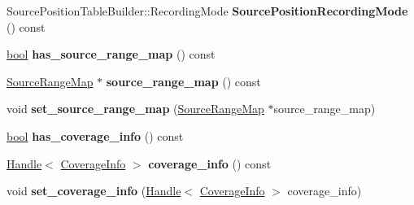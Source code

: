\begin{DoxyCompactItemize}
Source\+Position\+Table\+Builder\+::\+Recording\+Mode {\bfseries Source\+Position\+Recording\+Mode} () const
\item 
\mbox{\label{classv8_1_1internal_1_1UnoptimizedCompilationInfo_a14528d60e3cf38f20cedcdd180f4466e}} 
\mbox{\hyperlink{classbool}{bool}} {\bfseries has\+\_\+source\+\_\+range\+\_\+map} () const
\item 
\mbox{\label{classv8_1_1internal_1_1UnoptimizedCompilationInfo_ad9f3c966c5a079d2430c6d19c68a5131}} 
\mbox{\hyperlink{classv8_1_1internal_1_1SourceRangeMap}{Source\+Range\+Map}} $\ast$ {\bfseries source\+\_\+range\+\_\+map} () const
\item 
\mbox{\label{classv8_1_1internal_1_1UnoptimizedCompilationInfo_a5d05db1124532744b39b43b663d7d792}} 
void {\bfseries set\+\_\+source\+\_\+range\+\_\+map} (\mbox{\hyperlink{classv8_1_1internal_1_1SourceRangeMap}{Source\+Range\+Map}} $\ast$source\+\_\+range\+\_\+map)
\item 
\mbox{\label{classv8_1_1internal_1_1UnoptimizedCompilationInfo_a555a5461debea88eee43b521269cbd8d}} 
\mbox{\hyperlink{classbool}{bool}} {\bfseries has\+\_\+coverage\+\_\+info} () const
\item 
\mbox{\label{classv8_1_1internal_1_1UnoptimizedCompilationInfo_ad54a000243001ab44c3c28df33751582}} 
\mbox{\hyperlink{classv8_1_1internal_1_1Handle}{Handle}}$<$ \mbox{\hyperlink{classv8_1_1internal_1_1CoverageInfo}{Coverage\+Info}} $>$ {\bfseries coverage\+\_\+info} () const
\item 
\mbox{\label{classv8_1_1internal_1_1UnoptimizedCompilationInfo_ab5d14c7a368ade8596f2a7bfff540040}} 
void {\bfseries set\+\_\+coverage\+\_\+info} (\mbox{\hyperlink{classv8_1_1internal_1_1Handle}{Handle}}$<$ \mbox{\hyperlink{classv8_1_1internal_1_1CoverageInfo}{Coverage\+Info}} $>$ coverage\+\_\+info)
\item 
\mbox{\label{classv8_1_1internal_1_1UnoptimizedCompilationInfo_a343a4b583147140c79f06086cc6634be}} 

\end{DoxyCompactItemize}
